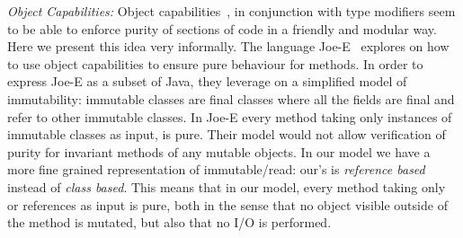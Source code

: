 \noindent
\textit{Object Capabilities:}
Object capabilities~\cite{RobustComposition}, in conjunction with type modifiers seem to be able to
 enforce purity of sections of code in a friendly and modular way.
Here we present this idea very informally.
The language Joe-E~\cite{finifter2008verifiable}
explores on how to use object capabilities to ensure
pure behaviour for methods.
In order to express Joe-E as a subset of Java,
they leverage on a simplified model of immutability:
immutable classes are final classes where all the fields are final and refer to other immutable classes.
In Joe-E every method taking only instances of immutable classes as input, is pure.
Their model would not allow verification of purity for invariant methods of any mutable objects.
In our model we have a more fine grained representation of immutable/read:
our’s is \emph{reference based} instead of \emph{class based}.
This means that in our model, every method taking only \Q@read@ or \Q@imm@ references as input is pure,
both in the sense that no object visible outside of the method is mutated, but also
that no I/O is performed.



